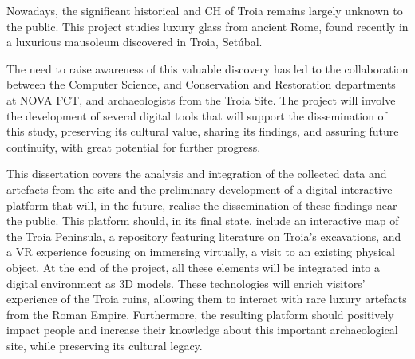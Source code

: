 
Nowadays, the significant historical and \gls{CH} of Troia remains largely unknown to the public. This project studies luxury glass from ancient Rome, found recently in a luxurious mausoleum discovered in Troia, Setúbal.  

The need to raise awareness of this valuable discovery has led to the collaboration between the Computer Science, and Conservation and Restoration departments at NOVA FCT, and archaeologists from the Troia Site. The project will involve the development of several digital tools that will support the dissemination of this study, preserving its cultural value, sharing its findings, and assuring future continuity, with great potential for further progress.  

This dissertation covers the analysis and integration of the collected data and artefacts from the site and the preliminary development of a digital interactive platform that will, in the future, realise the dissemination of these findings near the public. This platform should, in its final state, include an interactive map of the Troia Peninsula, a repository featuring literature on Troia’s excavations, and a \gls{VR} experience focusing on immersing virtually, a visit to an existing physical object. At the end of the project, all these elements will be integrated into a digital environment as \gls{3D} models. These technologies will enrich visitors' experience of the Troia ruins, allowing them to interact with rare luxury artefacts from the Roman Empire. Furthermore, the resulting platform should positively impact people and increase their knowledge about this important archaeological site, while preserving its cultural legacy. 



